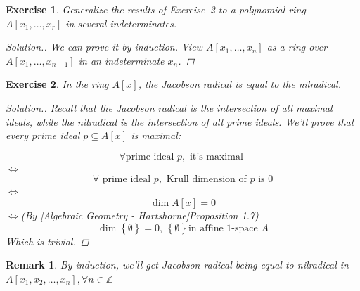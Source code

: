 \documentclass{article}
\theoremstyle{breakstyle}
\newtheorem{exercise}{Exercise}
\newtheorem{remark}{Remark}
\newenvironment{solution}
  {\begin{proof}[Solution.]\renewcommand{\qedsymbol}{}}
  {\end{proof}}
\begin{document}
\begin{exercise}
Generalize the results of Exercise~2 to a polynomial ring \(A[x_1,\ldots,x_r]\) in several indeterminates.

\begin{solution}
    We can prove it by induction. View $A[x_1,\ldots ,x_{n}]$ as a ring over $A[x_1,\ldots ,x_{n-1}]$ in an indeterminate $x_{n}$.
\end{solution}
\end{exercise}

\begin{exercise}
In the ring \(A[x]\), the Jacobson radical is equal to the nilradical.

\begin{solution}
    Recall that the Jacobson radical is the intersection of all maximal ideals, while the nilradical is the intersection of all prime ideals.
        We'll prove that every prime ideal $p\subseteq A[x]$ is maximal:

        $$
        \forall \text{prime ideal }p,\text{ it's maximal }
        $$
        $\Leftrightarrow$ 
        $$
        \forall\text{ prime ideal }p,\text{ Krull dimension of }p\text{ is }0
        $$
        $\Leftrightarrow$
        $$
        \dim{A[x]}=0
        $$
        $\Leftrightarrow$(By \emph{[Algebraic Geometry - Hartshorne]Proposition 1.7}) 
        $$
        \dim{\left\{ \emptyset \right\} }=0\text{, }\left\{ \emptyset \right\} \text{in affine }1\text{-space }A
        $$
        Which is trivial.
\end{solution}
\end{exercise}

\begin{remark}
    By induction, we'll get Jacobson radical being equal to nilradical in $A[x_1,x_2,\ldots ,x_{n}],\forall n \in \mathbb{Z}^{+}$
\end{remark}
\end{document}
